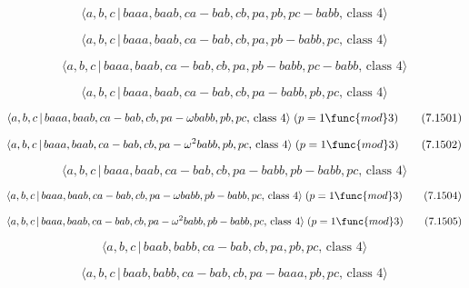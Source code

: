 \documentclass[10pt]{article}
\begin{document}
\begin{equation}
\langle a,b,c\,|\,baaa,baab,ca-bab,cb,pa,pb,pc-babb,\,\text{class }4\rangle 
\tag{7.1497}
\end{equation}

\begin{equation}
\langle a,b,c\,|\,baaa,baab,ca-bab,cb,pa,pb-babb,pc,\,\text{class }4\rangle 
\tag{7.1498}
\end{equation}

\begin{equation}
\langle a,b,c\,|\,baaa,baab,ca-bab,cb,pa,pb-babb,pc-babb,\,\text{class }%
4\rangle  \tag{7.1499}
\end{equation}

\begin{equation}
\langle a,b,c\,|\,baaa,baab,ca-bab,cb,pa-babb,pb,pc,\,\text{class }4\rangle 
\tag{7.1500}
\end{equation}

\begin{equation}
\langle a,b,c\,|\,baaa,baab,ca-bab,cb,pa-\omega babb,pb,pc,\,\text{class }%
4\rangle \;(p=1\func{mod}3)  \tag{7.1501}
\end{equation}

\begin{equation}
\langle a,b,c\,|\,baaa,baab,ca-bab,cb,pa-\omega ^{2}babb,pb,pc,\,\text{class 
}4\rangle \;(p=1\func{mod}3)  \tag{7.1502}
\end{equation}

\begin{equation}
\langle a,b,c\,|\,baaa,baab,ca-bab,cb,pa-babb,pb-babb,pc,\,\text{class }%
4\rangle  \tag{7.1503}
\end{equation}

\begin{equation}
\langle a,b,c\,|\,baaa,baab,ca-bab,cb,pa-\omega babb,pb-babb,pc,\,\text{%
class }4\rangle \;(p=1\func{mod}3)  \tag{7.1504}
\end{equation}

\begin{equation}
\langle a,b,c\,|\,baaa,baab,ca-bab,cb,pa-\omega ^{2}babb,pb-babb,pc,\,\text{%
class }4\rangle \;(p=1\func{mod}3)  \tag{7.1505}
\end{equation}

\begin{equation}
\langle a,b,c\,|\,baab,babb,ca-bab,cb,pa,pb,pc,\,\text{class }4\rangle 
\tag{7.1506}
\end{equation}

\begin{equation}
\langle a,b,c\,|\,baab,babb,ca-bab,cb,pa-baaa,pb,pc,\,\text{class }4\rangle 
\tag{7.1507}
\end{equation}
\end{document}
